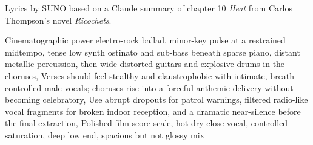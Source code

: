 
\begin{notes}
Lyrics by SUNO based on a Claude summary of chapter 10 \emph{Heat} from Carlos Thompson's novel \emph{Ricochets}.
\end{notes}
\begin{style}
Cinematographic power electro-rock ballad, minor-key pulse at a restrained midtempo, tense low synth ostinato and sub-bass beneath sparse piano, distant metallic percussion, then wide distorted guitars and explosive drums in the choruses, Verses should feel stealthy and claustrophobic with intimate, breath-controlled male vocals; choruses rise into a forceful anthemic delivery without becoming celebratory, Use abrupt dropouts for patrol warnings, filtered radio-like vocal fragments for broken indoor reception, and a dramatic near-silence before the final extraction, Polished film-score scale, hot dry close vocal, controlled saturation, deep low end, spacious but not glossy mix
\end{style}
